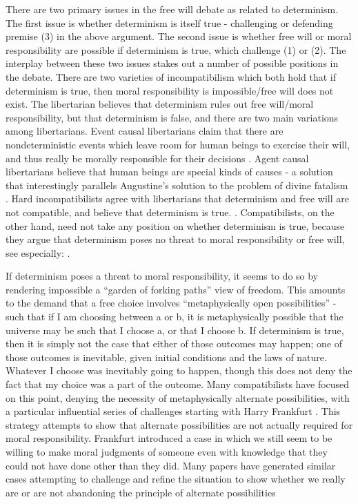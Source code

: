 \documentclass[phd,12pt,oneside,paper=letterpaper]{ubcthesis}
\begin{document}
There are two primary issues in the free will debate as related to determinism. The first issue is whether determinism is itself true - challenging or defending premise (3) in the above argument. The second issue is whether free will or moral responsibility are possible if determinism is true, which challenge (1) or (2). The interplay between these two issues stakes out a number of possible positions in the debate. There are two varieties of incompatibilism which both hold that if determinism is true, then moral responsibility is impossible/free will does not exist. The libertarian believes that determinism rules out free will/moral responsibility, but that determinism is false, and there are two main variations among libertarians. Event causal libertarians claim that there are nondeterministic events which leave room for human beings to exercise their will, and thus really be morally responsible for their decisions \citep{kane1999, balaguer2004}. Agent causal libertarians believe that human beings are special kinds of causes - a solution that interestingly parallels Augustine's solution to the problem of divine fatalism \citep{oconnor2005, clarke1993}. Hard incompatibilists agree with libertarians that determinism and free will are not compatible, and believe that determinism is true. \citep{strawsong2010, pereboom2001}. Compatibilists, on the other hand, need not take any position on whether determinism is true, because they argue that determinism poses no threat to moral responsibility or free will, see especially: \citep{strawsonp1974, watson1986, bok1998, smart1961, frankfurt1969, frankfurt1971, fischerravizza1998}.

If determinism poses a threat to moral responsibility, it seems to do so by rendering impossible a ``garden of forking paths'' view of freedom. This amounts to the demand that a free choice involves ``metaphysically open possibilities'' - such that if I am choosing between a or b, it is metaphysically possible that the universe may be such that I choose a, or that I choose b. If determinism is true, then it is simply not the case that either of those outcomes may happen; one of those outcomes is inevitable, given initial conditions and the laws of nature. Whatever I choose was inevitably going to happen, though this does not deny the fact that my choice was a part of the outcome. Many compatibilists have focused on this point, denying the necessity of metaphysically alternate possibilities, with a particular influential series of challenges starting with Harry Frankfurt \citeyearpar{frankfurt1969, frankfurt1971}. This strategy attempts to show that alternate possibilities are not actually required for moral responsibility. Frankfurt introduced a case in which we still seem to be willing to make moral judgments of someone even with knowledge that they could not have done other than they did. Many papers have generated similar cases attempting to challenge and refine the situation to show whether we really are or are not abandoning the principle of alternate possibilities \citep{pereboom2001, kane1998, mele1995, fischer1986, inwagen1986}
\end{document}

